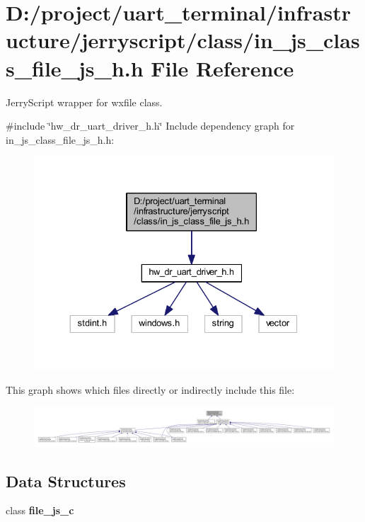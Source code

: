 \section{D\+:/project/uart\+\_\+terminal/infrastructure/jerryscript/class/in\+\_\+js\+\_\+class\+\_\+file\+\_\+js\+\_\+h.h File Reference}
\label{in__js__class__file__js__h_8h}


Jerry\+Script wrapper for wxfile class.  


{\ttfamily \#include \char`\"{}hw\+\_\+dr\+\_\+uart\+\_\+driver\+\_\+h.\+h\char`\"{}}\newline
Include dependency graph for in\+\_\+js\+\_\+class\+\_\+file\+\_\+js\+\_\+h.\+h\+:\nopagebreak
\begin{figure}[H]
\begin{center}
\leavevmode
\includegraphics[width=330pt]{in__js__class__file__js__h_8h__incl}
\end{center}
\end{figure}
This graph shows which files directly or indirectly include this file\+:\nopagebreak
\begin{figure}[H]
\begin{center}
\leavevmode
\includegraphics[width=350pt]{in__js__class__file__js__h_8h__dep__incl}
\end{center}
\end{figure}
\subsection*{Data Structures}
\begin{DoxyCompactItemize}
\item 
class \textbf{ file\+\_\+js\+\_\+c}
\end{DoxyCompactItemize}


